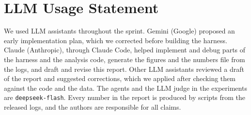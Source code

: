 \documentclass[11pt, a4paper]{article}
\begin{document}
\section*{LLM Usage Statement}
We used LLM assistants throughout the sprint. Gemini (Google) proposed an early implementation plan, which we corrected before building the harness. Claude (Anthropic), through Claude Code, helped implement and debug parts of the harness and the analysis code, generate the figures and the numbers file from the logs, and draft and revise this report. Other LLM assistants reviewed a draft of the report and suggested corrections, which we applied after checking them against the code and the data. The agents and the LLM judge in the experiments are \texttt{deepseek-flash}. Every number in the report is produced by scripts from the released logs, and the authors are responsible for all claims.
\end{document}
